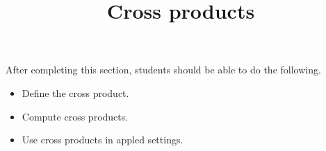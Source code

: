 \documentclass{ximera}
\title{Cross products}
\begin{document}
\begin{abstract}
\end{abstract}

\maketitle

\begin{sectionOutcomes}

After completing this section, students should be able to do the following.

\begin{itemize}
\item Define the cross product.
\item Compute cross products.
\item Use cross products in appled settings. 
\end{itemize}

\end{sectionOutcomes}
\end{document}

